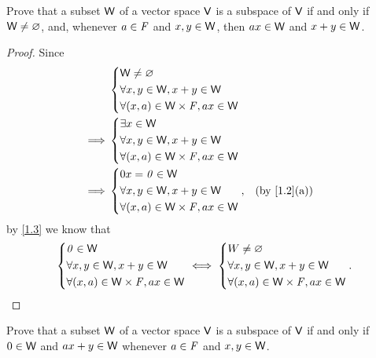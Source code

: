 \begin{ex}\label{ex:1.3.17}
	Prove that a subset \(\mathsf{W}\) of a vector space \(\mathsf{V}\) is a subspace of \(\mathsf{V}\) if and only if \(\mathsf{W} \neq \varnothing\), and, whenever \(a \in \mathit{F}\) and \(x, y \in \mathsf{W}\), then \(ax \in \mathsf{W}\) and \(x + y \in \mathsf{W}\).
\end{ex}

\begin{proof}
	Since
	\begin{align*}
		         & \begin{dcases}
			\W \neq \varnothing               \\
			\forall x, y \in \W, x + y \in \W \\
			\forall (x, a) \in \W \times \F, ax \in \W
		\end{dcases}                                 \\
		\implies & \begin{dcases}
			\exists x \in \W                  \\
			\forall x, y \in \W, x + y \in \W \\
			\forall (x, a) \in \W \times \F, ax \in \W
		\end{dcases}                                 \\
		\implies & \begin{dcases}
			0x = \zv \in \W                   \\
			\forall x, y \in \W, x + y \in \W \\
			\forall (x, a) \in \W \times \F, ax \in \W
		\end{dcases}, &  & \text{(by \cref{1.2}(a))}
	\end{align*}
	by \cref{1.3} we know that
	\[
		\begin{dcases}
			\mathit{0} \in \mathsf{W}                        \\
			\forall x, y \in \mathsf{W}, x + y \in \mathsf{W} \\
			\forall (x, a) \in \mathsf{W} \times \mathit{F}, ax \in \mathsf{W}
		\end{dcases} \iff \begin{dcases}
			W \neq \varnothing                \\
			\forall x, y \in \mathsf{W}, x + y \in \mathsf{W} \\
			\forall (x, a) \in \mathsf{W} \times \mathit{F}, ax \in \mathsf{W}
		\end{dcases}.
	\]
\end{proof}

\begin{ex}\label{ex:1.3.18}
	Prove that a subset \(\mathsf{W}\) of a vector space \(\mathsf{V}\) is a subspace of \(\mathsf{V}\) if and only if \(0 \in \mathsf{W}\) and \(ax + y \in \mathsf{W}\) whenever \(a \in \mathit{F}\) and \(x, y \in \mathsf{W}\).
\end{ex}

